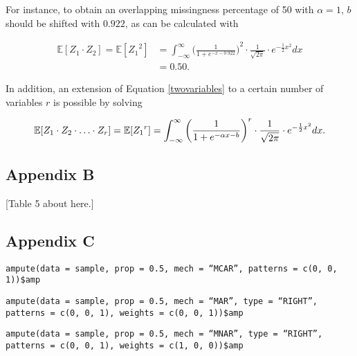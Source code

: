 \documentclass[]{interact}
\newcommand{\code}[1]{\texttt{#1}}
\begin{document}
\noindent For instance, to obtain an overlapping missingness percentage of 50 with $\alpha = 1$, $b$ should be shifted with $0.922$, as can be calculated with 

\begin{align*}
\mathbb{E}[Z_1 \cdot Z_2] = \mathbb{E}[{Z_1}^2] &= \int_{-\infty}^\infty {\bigg(\frac{1}{1 + e^{-x - 0.922}}\bigg)}^2 \cdot \frac{1}{\sqrt{2\pi}}\cdot e^{-\frac{1}{2}x^2} dx\\
&= 0.50.
\end{align*}

\noindent In addition, an extension of Equation \eqref{twovariables} to a certain number of variables $r$ is possible by solving 

\[
\mathbb{E}[Z_1 \cdot Z_2 \cdot \hdots \cdot Z_r] = \mathbb{E}[{Z_1}^r] = \int_{-\infty}^\infty {\bigg(\frac{1}{1 + e^{-\alpha x - b}}\bigg)}^r \cdot \frac{1}{\sqrt{2\pi}}\cdot e^{-\frac{1}{2}x^2} dx.\\
\]

\subsection*{Appendix B}

[Table 5 about here.]

\subsection*{Appendix C}

\code{ampute(data = sample, prop = 0.5, mech = ``MCAR'', patterns = c(0, 0, 1))\$amp}

\vspace{5mm}
\noindent \code{ampute(data = sample, prop = 0.5, mech = ``MAR'', type = ``RIGHT'', patterns = c(0, 0, 1), weights = c(0, 0, 1))\$amp}

\vspace{5mm}
\noindent \code{ampute(data = sample, prop = 0.5, mech = ``MNAR'', type = ``RIGHT'', patterns = c(0, 0, 1), weights = c(1, 0, 0))\$amp}

\newpage
\end{document}
